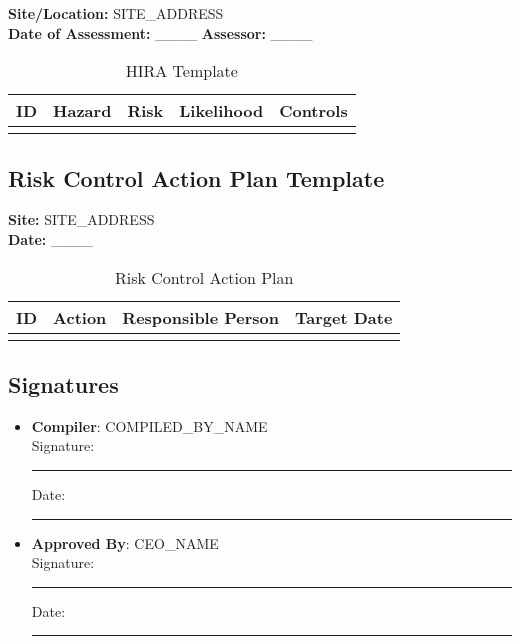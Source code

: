 \documentclass[11pt]{article}
\newcommand{\siteAddress}{{{SITE_ADDRESS}}}
\newcommand{\compilerName}{{{COMPILED_BY_NAME}}}
\begin{document}
\textbf{Site/Location:} \siteAddress \\
\textbf{Date of Assessment:} \_\_\_\_ \textbf{Assessor:} \_\_\_\_

\begin{table}[h]
    \centering
    \begin{tabular}{p{2cm}p{3cm}p{3cm}p{3cm}p{3cm}}
        \toprule
        \textbf{ID} & \textbf{Hazard} & \textbf{Risk} & \textbf{Likelihood} & \textbf{Controls} \\
        \midrule
        & & & & \\
        \bottomrule
    \end{tabular}
    \caption{HIRA Template}
\end{table}

\subsection*{Risk Control Action Plan Template}

\textbf{Site:} \siteAddress \\
\textbf{Date:} \_\_\_\_

\begin{table}[h]
    \centering
    \begin{tabular}{p{2cm}p{5cm}p{3cm}p{3cm}}
        \toprule
        \textbf{ID} & \textbf{Action} & \textbf{Responsible Person} & \textbf{Target Date} \\
        \midrule
        & & & \\
        \bottomrule
    \end{tabular}
    \caption{Risk Control Action Plan}
\end{table}

\subsection*{Signatures}
\begin{itemize}
  \item \textbf{Compiler}: \compilerName \\
    Signature: \rule{5cm}{0.4pt} \quad Date: \rule{3cm}{0.4pt}
  \item \textbf{Approved By}: {{CEO_NAME}} \\
    Signature: \rule{5cm}{0.4pt} \quad Date: \rule{3cm}{0.4pt}
\end{itemize}
\end{document}
